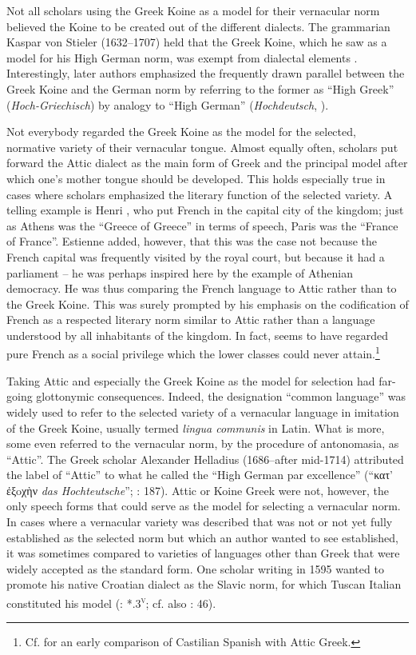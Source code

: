 Not all scholars using the Greek Koine as a model for their vernacular norm believed the Koine to be created out of the different dialects. The grammarian Kaspar von Stieler (1632–1707) held that the Greek Koine, which he saw as a model for his High German norm, was exempt from dialectal elements \citep[2]{Stieler1691}. Interestingly, later authors emphasized the frequently drawn parallel between the Greek Koine and the German norm by referring to the former as “High Greek” (\textit{Hoch-Griechisch}) by analogy to “High German” (\textit{Hochdeutsch}, \citet[13]{Schuster1737}).

Not everybody regarded the Greek Koine as the model for the selected, normative variety of their vernacular tongue. Almost equally often, scholars put forward the Attic dialect as the main form of Greek and the principal model after which one’s mother tongue should be developed. This holds especially true in cases where scholars emphasized the literary function of the selected variety. A telling example is Henri \citet[*.iii\textsc{\textsuperscript{v}}]{Estienne1582}, who put French in the capital city of the kingdom; just as Athens was the “Greece of Greece” in terms of speech, Paris was the “France of France”. Estienne added, however, that this was the case not because the French capital was frequently visited by the royal court, but because it had a parliament – he was perhaps inspired here by the example of Athenian democracy. He was thus comparing the French language to Attic rather than to the Greek Koine. This was surely prompted by his emphasis on the codification of French as a respected literary norm similar to Attic rather than a language understood by all inhabitants of the kingdom. In fact, \citet[*.iii\textsc{\textsuperscript{r}}]{Estienne1582} seems to have regarded pure French as a social privilege which the lower classes could never attain.\footnote{Cf. \citet[\textsc{xxxiii}\textsc{\textsuperscript{v}}]{Marineo1497} for an early comparison of Castilian Spanish with Attic Greek.}

Taking Attic and especially the Greek Koine as the model for selection had far-going glottonymic consequences. Indeed, the designation “common language” was widely used to refer to the selected variety of a vernacular language in imitation of the Greek Koine, usually termed \textit{lingua communis} in Latin. What is more, some even referred to the vernacular norm, by the procedure of antonomasia, as “Attic”. The Greek scholar Alexander Helladius (1686–after mid-1714) attributed the label of “Attic” to what he called the “High German par excellence” (“κατ’ ἐξoχὴν \textit{das Hochteutsche}”; \citealt{Helladius1714}: 187). Attic or Koine Greek were not, however, the only speech forms that could serve as the model for selecting a vernacular norm. In cases where a vernacular variety was described that was not or not yet fully established as the selected norm but which an author wanted to see established, it was sometimes compared to varieties of languages other than Greek that were widely accepted as the standard form. One scholar writing in 1595 wanted to promote his native Croatian dialect as the Slavic norm, for which Tuscan Italian constituted his model (\citealt{Veranzio1595}: *.3\textsc{\textsuperscript{v}}; cf. also \citealt{Schoppe1636}: 46).

